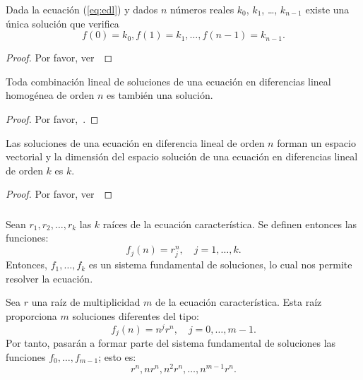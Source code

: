 \begin{frame}

\begin{theorem}
	Dada la ecuación (\ref{eq:edl}) y dados $n$ números reales $k_{0}$, $k_{1}$, \ldots, $k_{n-1}$ existe una única solución que verifica \[ f\left(0\right)=k_{0},f\left(1\right)=k_{1},\ldots,f\left(n-1\right)=k_{n-1}. \]
\end{theorem}
\begin{proof}
	Por favor, ver~%
\end{proof}

\begin{theorem}
	Toda combinación lineal de soluciones de una ecuación en diferencias lineal homogénea de orden $n$ es también una solución.
\end{theorem}
\begin{proof}
		Por favor,~\citeauthor[ver][357]{Mariconda2016}.
\end{proof}

\begin{theorem}
	Las soluciones de una ecuación en diferencia lineal de orden $n$ forman un espacio vectorial y la dimensión del espacio solución de una ecuación en diferencias lineal de orden $k$ es $k$.
\end{theorem}
\begin{proof}
		Por favor, ver~%
\end{proof}
\end{frame}

\begin{frame}
\frametitle{\subsubsecname}

\begin{definition}
	Sean $r_{1}, r_{2},\ldots, r_{k}$ las $k$ raíces de la ecuación característica. Se definen entonces las funciones: \[ f_{j}(n)=r^{n}_{j},\quad j=1,\ldots,k. \] Entonces, $f_{1},\ldots,f_{k}$ es un sistema fundamental de soluciones, lo cual nos permite resolver la ecuación. %
\end{definition}

\begin{definition}
	Sea $r$ una raíz de multiplicidad $m$ de la ecuación característica. Esta raíz proporciona $m$ soluciones diferentes del tipo: \[ f_{j}(n)=n^{j}r^{n},\quad j= 0,\ldots,m-1. \] Por tanto, pasarán a formar parte del sistema fundamental de soluciones las funciones $f_{0},\ldots,f_{m-1}$; esto es: \[ r^{n},nr^{n},n^{2}r^{n},\ldots,n^{m-1}r^{n}. \]
\end{definition}
\end{frame}

